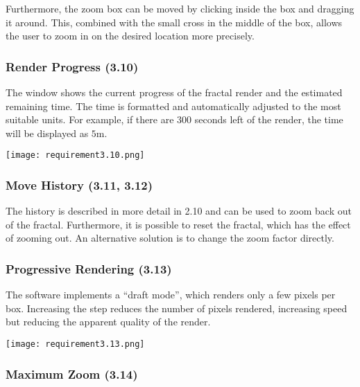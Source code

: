 Furthermore, the zoom box can be moved by clicking inside the box and dragging it around. This, combined with the small cross in the middle of the box, allows the user to zoom in on the desired location more precisely.

\subsubsection{Render Progress (3.10)}

The  window shows the current progress of the fractal render and the estimated remaining time. The time is formatted and automatically adjusted to the most suitable units. For example, if there are 300 seconds left of the render, the time will be displayed as $5 \mathrm{m}$.

\FloatBarrier
\begin{figure*}[htp]
	\centering
	\texttt{[image: requirement3.10.png]}
\end{figure*}
\FloatBarrier

\subsubsection{Move History (3.11, 3.12)}

The history is described in more detail in 2.10 and can be used to zoom back out of the fractal. Furthermore, it is possible to reset the fractal, which has the effect of zooming out. An alternative solution is to change the zoom factor directly.

\subsubsection{Progressive Rendering (3.13)}

The software implements a ``draft mode'', which renders only a few pixels per box. Increasing the step reduces the number of pixels rendered, increasing speed but reducing the apparent quality of the render.

\FloatBarrier
\begin{figure*}[htp]
	\centering
	\texttt{[image: requirement3.13.png]}
\end{figure*}
\FloatBarrier

\subsubsection{Maximum Zoom (3.14)}

